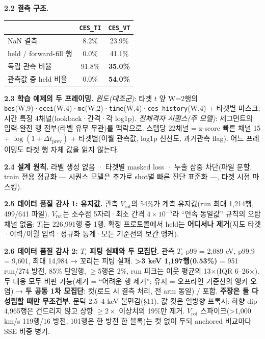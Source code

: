\documentclass[10pt,a4paper]{article}
\newcommand{\Ti}{\ensuremath{T_i}}
\newcommand{\Vrot}{\ensuremath{V_\mathrm{rot}}}
\begin{document}
\textbf{2.2 결측 구조.}
\begin{center}\small
\begin{tabular}{lcc}\toprule
 & \texttt{CES\_TI} & \texttt{CES\_VT} \\ \midrule
NaN 결측 & 8.2\% & 23.9\% \\
held / forward-fill 행 & 0.0\% & 41.1\% \\
독립 관측 비율 & 91.8\% & \textbf{35.0\%} \\
관측값 중 held 비율 & 0.0\% & \textbf{54.0\%} \\ \bottomrule
\end{tabular}
\end{center}

\textbf{2.3 학습 예제의 두 프레이밍.} \emph{윈도(대조군)}: 타겟 $t$ 앞 W=2행의 \texttt{bes}(W,9)·\texttt{ecei}(W,4)·\texttt{mc}(W,2)·\texttt{time}(W,4)·\texttt{ces\_history}(W,4) + 타겟별 마스크; 시간 특징 4채널(lookback·간격·각 log1p). \emph{전체격자 시퀀스(주 모델)}: 세그먼트의 입력-완전 행 전부(라벨 유무 무관)를 맥락으로. 스텝당 22채널 = z-score 빠른 채널 15 + $\log(1+\Delta t_\text{prev})$ + 타겟별(이월 관측값, log1p 신선도, 과거관측 flag). 어느 프레이밍도 타겟 행 자체 값을 읽지 않는다.

\textbf{2.4 설계 원칙.} 라벨 생성 없음 · 타겟별 masked loss · 누출 삼중 차단(파일 분할, train 전용 정규화 — 시퀀스 모델은 추가로 shot별 빠른 진단 표준화 —, 타겟 시점 마스킹).

\textbf{2.5 데이터 품질 감사 1: 유지값.} 관측 \Vrot{}의 54\%가 계측 유지값(run 최대 1,214행, 499/641 파일). \Vrot{}는 소수점 5자리·최소 간격 $4\times10^{-5}$라 ``연속 동일값'' 규칙의 오탐 채널 없음; \Ti{}는 226,991행 중 1행. 확정 프로토콜에서 held는 \textbf{어디서나 제거}(지도 타겟·이력/이월 입력·정규화 통계·모든 기준선의 보간 앵커).

\textbf{2.6 데이터 품질 감사 2: \Ti{} 피팅 실패와 두 모집단.} 관측 \Ti{} p99 = 2,089 eV, p99.9 = 9,601, 최대 14,984 → 꼬리는 피팅 실패. \textbf{>3 keV 1,197행(0.53\%)} = 951 run/274 방전, 85\% 단일행, $\geq$5행은 2\%, run 피크는 이웃 평균의 13$\times$(IQR 6–26$\times$). 두 대응 모두 비판 가능(제거 = ``어려운 행 제거''; 유지 = 오프라인 기준선의 앵커 오염) → \textbf{두 공동 1차 모집단}: 컷(로드 시 결측 처리, 전 arm 동일) / 포함. \textbf{주장은 둘 다 성립할 때만 무조건부}. 문턱 2.5–4 keV 불민감(\S11). 값 컷은 일방향 프록시: 하향 dip 4,965행은 건드리지 않고 상향 $\geq2\times$ 이상치의 19\%만 제거. \Vrot{} 스파이크(>1,000 km/s 119행/16 방전, 101행은 한 방전 한 블록)는 컷 없이 두되 anchored 비교마다 SSE 비중 병기.
\end{document}
